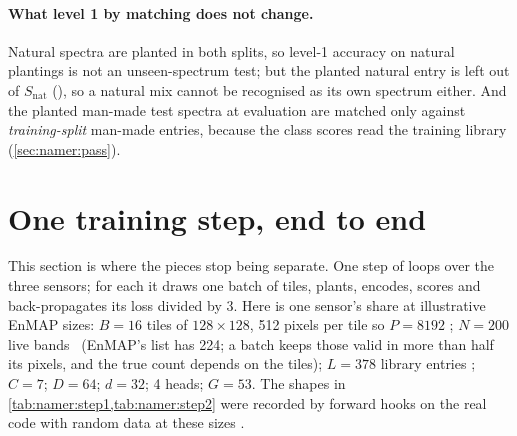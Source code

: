 \paragraph{What level 1 by matching does not change.} Natural spectra are planted in both splits, so level-1 accuracy
on natural plantings is not an unseen-spectrum test; but the planted natural entry is left out of $S_{\text{nat}}$
(), so a natural mix cannot be recognised as its own spectrum either. And the planted man-made test
spectra at evaluation are matched only against \emph{training-split} man-made entries, because the class scores read
the training library (\cref{sec:namer:pass}).

\section{One training step, end to end}\label{sec:namer:step}

This section is where the pieces stop being separate. One step of  loops over the three sensors;
for each it draws one batch of tiles, plants, encodes, scores and back-propagates its loss divided by 3. Here is one
sensor's share at illustrative EnMAP sizes: $B=16$ tiles of $128\times128$, 512 pixels per tile so $P=8192$
; $N=200$ live bands \tagA\ (EnMAP's list has 224; a batch keeps those valid in more than
half its pixels, and the true count depends on the tiles); $L=378$ library entries \tagC; $C=7$; $D=64$; $d=32$; 4
heads; $G=53$. The shapes in \cref{tab:namer:step1,tab:namer:step2} were recorded by forward hooks on the real code with
random data at these sizes \tagC.

